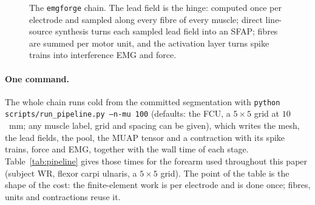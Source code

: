 \documentclass[11pt,a4paper]{article}
\newcommand{\emgforge}{\texttt{emgforge}}
\begin{document}
\begin{figure}[tbp]
\centering
{}
\caption{The \emgforge{} chain. The lead field is the hinge: computed once per electrode
and sampled along every fibre of every muscle; direct line-source synthesis turns each
sampled lead field into an SFAP; fibres are summed per motor unit, and the activation
layer turns spike trains into interference EMG and force.}
\label{fig:pipeline}
\end{figure}

\paragraph{One command.} The whole chain runs cold from the committed segmentation with
\texttt{python scripts/run\_pipeline.py --n-mu 100} (defaults: the FCU, a $5\times5$ grid
at $10$~mm; any muscle label, grid and spacing can be given), which writes the mesh, the
lead fields, the pool, the MUAP tensor and a contraction with its spike trains, force
and EMG, together with the wall time of each stage. Table~\ref{tab:pipeline} gives those
times for the forearm used throughout this paper (subject WR, flexor carpi ulnaris, a
$5\times5$ grid). The point of the table is the shape of the cost: the finite-element work
is per electrode and is done once; fibres, units and contractions reuse it.
\end{document}
